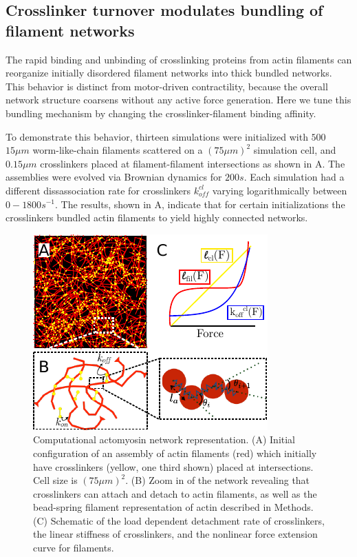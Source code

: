 \documentclass[12pt]{article}
\begin{document}
\subsection{Crosslinker turnover modulates bundling of filament networks}
The rapid binding and unbinding of crosslinking proteins from actin
filaments can reorganize initially disordered filament networks into 
thick bundled networks. This behavior is distinct from motor-driven 
contractility, because the overall network structure coarsens without
any active force generation. Here we tune this bundling mechanism by
changing the crosslinker-filament binding affinity. 
\par
To demonstrate this behavior, thirteen simulations were initialized with $500$ 
$15\mu m$ worm-like-chain filaments scattered on a $(75\mu m)^2$
simulation cell, and $0.15\mu m$ crosslinkers placed at filament-filament 
intersections as shown in A. The assemblies were evolved via 
Brownian dynamics for $200s$. Each simulation had a different dissassociation 
rate for crosslinkers $k_{off}^{cl}$ varying logarithmically between 
$0-1800 s^{-1}$. The results, shown in A, indicate that for
certain initializations the crosslinkers bundled actin filaments to yield 
highly connected networks. 
\par
\begin{figure}[H] 
  \centering
  \includegraphics[scale=1.2]{figs/t0.pdf}
  \caption{\label{fig:t0}Computational actomyosin network representation.
  (A) Initial configuration of an assembly of actin filaments (red) which 
  initially have crosslinkers (yellow, one third shown) placed at intersections.
  Cell size is $(75\mu m)^2$. 
  (B) Zoom in of the network revealing that crosslinkers can attach and detach 
  to actin filaments, as well as the bead-spring filament representation of 
  actin described in Methods.
  (C) Schematic of the load dependent detachment rate of crosslinkers, the 
  linear stiffness of crosslinkers, and the nonlinear force extension curve for
  filaments.
  }
\end{figure}
\end{document}
